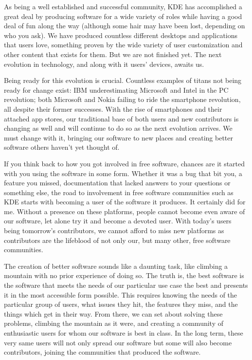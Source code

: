 

\noindent{}As being a well established and successful community, KDE has accomplished a great deal by producing software for a wide variety of roles while having a good deal of fun along the way (although some hair may have been lost, depending on who you ask). We have produced countless different desktops and applications that users love, something proven by the wide variety of user customization and other content that exists for them. But we are not finished yet. The next evolution in technology, and along with it users' devices, awaits us.

Being ready for this evolution is crucial. Countless examples of titans not being ready for change exist: IBM underestimating Microsoft and Intel in the PC revolution; both Microsoft and Nokia failing to ride the smartphone revolution, all despite their former successes. With the rise of smartphones and their attached app stores, our traditional base of both users and new contributors is changing as well and will continue to do so as the next evolution arrives. We must change with it, bringing our software to new places and creating better software others haven't yet thought of.

If you think back to how you got involved in free software, chances are it started with you using the software in some form. Whether it was a bug that bit you, a feature you missed, documentation that lacked answers to your questions or something else, the road to involvement in free software communities such as KDE starts with becoming a user of the software it produces. It certainly did for me. Without a presence on these platforms, people cannot become even aware of our software, let alone try it and become a devoted user. With today's users being tomorrow's contributors, we cannot afford to miss new platforms  as contributors are the lifeblood of not only our, but many other, free software communities.

The creation of better software sounds like a daunting task, like climbing a mountain with no prior experience of doing so. The truth is, the best software is the software that meets the needs of our particular use case the best and presents it in the most accessible form possible. This requires knowing the needs of the particular group of users, what issues they hit, the features they miss, and the things which get in their way. From there, we can set about solving these problems, climbing the mountain as it were, and creating a community of enthusiastic users for whom our software is best in class. In the long term, these very same users will not only spread our software but some will also become contributors, joining the communities that produced the software.

